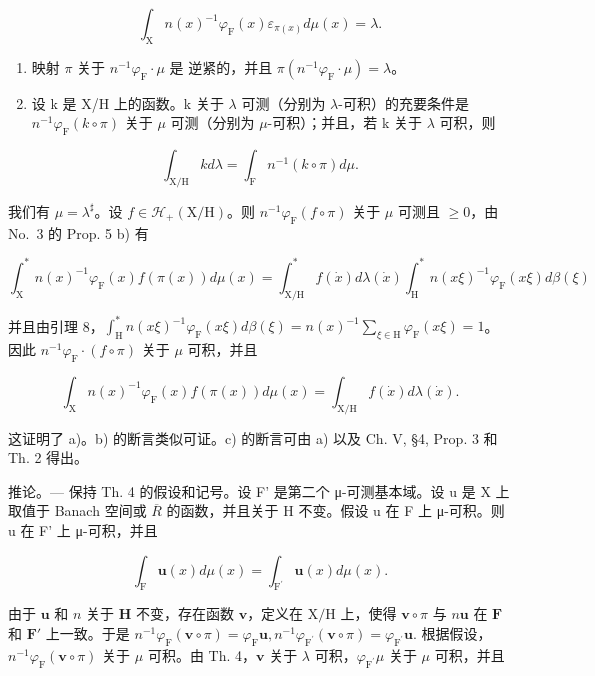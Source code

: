 \[
\int_ {\mathrm{X}} n (x) ^ {- 1} \varphi_ {\mathrm{F}} (x) \varepsilon_ {\pi (x)} d \mu (x) = \lambda .
\]

\begin{enumerate}
\def\labelenumi{\alph{enumi})}
\setcounter{enumi}{1}
\item
  映射 \(\pi\) 关于 \(n^{-1}\varphi_{\mathrm{F}}\cdot \mu\) 是 逆紧的，并且 \(\pi (n^{-1}\varphi_{\mathrm{F}}\cdot \mu) = \lambda\)。
\item
  设 k 是 X/H 上的函数。k 关于 \(\lambda\) 可测（分别为 \(\lambda\)-可积）的充要条件是 \(n^{-1}\varphi_{\mathrm{F}}(k\circ\pi)\) 关于 \(\mu\) 可测（分别为 \(\mu\)-可积）；并且，若 k 关于 \(\lambda\) 可积，则
\end{enumerate}

\[
\int_ {\mathrm{X/H}} k d \lambda = \int_ {\mathrm{F}} n ^ {- 1} (k \circ \pi) d \mu .
\]

我们有 \(\mu = \lambda^{\sharp}\)。设 \(f \in \mathcal{H}_{+}(\mathrm{X / H})\)。则 \(n^{-1}\varphi_{\mathrm{F}}(f \circ \pi)\) 关于 \(\mu\) 可测且 \(\geqslant 0\)，由 No.~3 的 Prop. 5 b) 有

\[
\int_ {\mathrm{X}} ^ {*} n (x) ^ {- 1} \varphi_ {\mathrm{F}} (x) f (\pi (x)) d \mu (x) = \int_ {\mathrm{X/H}} ^ {*} f (\dot {x}) d \lambda (\dot {x}) \int_ {\mathrm{H}} ^ {*} n (x \xi) ^ {- 1} \varphi_ {\mathrm{F}} (x \xi) d \beta (\xi)
\]

并且由引理 8，\(\int_{\mathrm{H}}^{*}n(x\xi)^{-1}\varphi_{\mathrm{F}}(x\xi)d\beta (\xi) = n(x)^{-1}\sum_{\xi \in \mathrm{H}}\varphi_{\mathrm{F}}(x\xi) = 1\)。因此 \(n^{-1}\varphi_{\mathrm{F}}\cdot (f\circ \pi)\) 关于 \(\mu\) 可积，并且

\[
\int_ {\mathrm{X}} n (x) ^ {- 1} \varphi_ {\mathrm{F}} (x) f (\pi (x)) d \mu (x) = \int_ {\mathrm{X/H}} f (\dot {x}) d \lambda (\dot {x}).
\]

这证明了 a)。b) 的断言类似可证。c) 的断言可由 a) 以及 Ch. V, §4, Prop. 3 和 Th. 2 得出。

推论。--- 保持 Th. 4 的假设和记号。设 F' 是第二个 μ-可测基本域。设 u 是 X 上取值于 Banach 空间或 \(\overline{R}\) 的函数，并且关于 H 不变。假设 u 在 F 上 μ-可积。则 u 在 F' 上 μ-可积，并且

\[
\int_ {\mathrm{F}} \mathbf {u} (x) d \mu (x) = \int_ {\mathrm{F} ^ {\prime}} \mathbf {u} (x) d \mu (x).
\]

由于 \(\mathbf{u}\) 和 \(n\) 关于 \(\mathbf{H}\) 不变，存在函数 \(\mathbf{v}\)，定义在 \(\mathrm{X / H}\) 上，使得 \(\mathbf{v} \circ \pi\) 与 \(n\mathbf{u}\) 在 \(\mathbf{F}\) 和 \(\mathbf{F}'\) 上一致。于是 \(n^{-1}\varphi_{\mathrm{F}}(\mathbf{v}\circ \pi) = \varphi_{\mathrm{F}}\mathbf{u}, n^{-1}\varphi_{\mathrm{F}^{\prime}}(\mathbf{v}\circ \pi) = \varphi_{\mathrm{F}^{\prime}}\mathbf{u}.\) 根据假设，\(n^{-1}\varphi_{\mathrm{F}}(\mathbf{v}\circ \pi)\) 关于 \(\mu\) 可积。由 Th. 4，\(\mathbf{v}\) 关于 \(\lambda\) 可积，\(\varphi_{\mathrm{F}^{\prime}}\mu\) 关于 \(\mu\) 可积，并且

